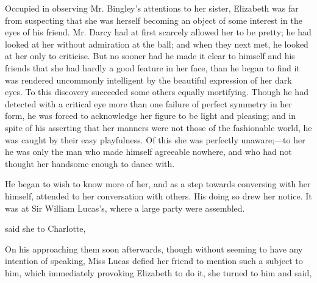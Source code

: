 
Occupied in observing Mr. Bingley's attentions to her sister, Elizabeth was far from suspecting that she was herself becoming an object of some interest in the eyes of his friend. Mr. Darcy had at first scarcely allowed her to be pretty; he had looked at her without admiration at the ball; and when they next met, he looked at her only to criticise. But no sooner had he made it clear to himself and his friends that she had hardly a good feature in her face, than he began to find it was rendered uncommonly intelligent by the beautiful expression of her dark eyes. To this discovery succeeded some others equally mortifying. Though he had detected with a critical eye more than one failure of perfect symmetry in her form, he was forced to acknowledge her figure to be light and pleasing; and in spite of his asserting that her manners were not those of the fashionable world, he was caught by their easy playfulness. Of this she was perfectly unaware;---to her he was only the man who made himself agreeable nowhere, and who had not thought her handsome enough to dance with.

He began to wish to know more of her, and as a step towards conversing with her himself, attended to her conversation with others. His doing so drew her notice. It was at Sir William Lucas's, where a large party were assembled.

 said she to Charlotte, 



On his approaching them soon afterwards, though without seeming to have any intention of speaking, Miss Lucas defied her friend to mention such a subject to him, which immediately provoking Elizabeth to do it, she turned to him and said,



